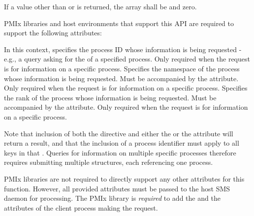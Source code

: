 If a value other than  or  is returned, the
 array shall be  and  zero.

\reqattrstart
\ac{PMIx} libraries and host environments that support this \ac{API} are required to support the following attributes:

In this context, specifies the process ID whose information is being requested - e.g., a query asking for the  of a specified process. Only required when the request is for information on a specific process.
\pasteAttributeItemEnd
{}Specifies the namespace of the process whose information is being requested. Must be accompanied by the  attribute. Only required when the request is for information on a specific process.
\pasteAttributeItemEnd
{}Specifies the rank of the process whose information is being requested. Must be accompanied by the  attribute. Only required when the request is for information on a specific process.
\pasteAttributeItemEnd
{}

Note that inclusion of both the  directive and either the  or the  attribute will return a  result, and that the inclusion of a process identifier must apply to all keys in that . Queries for information on multiple specific processes therefore requires submitting multiple  structures, each referencing one process.

\ac{PMIx} libraries are not required to directly support any other attributes for this function. However, all provided attributes must be passed to the host \ac{SMS} daemon for processing. The \ac{PMIx} library is \textit{required} to add the  and the  attributes of the client process making the request.

